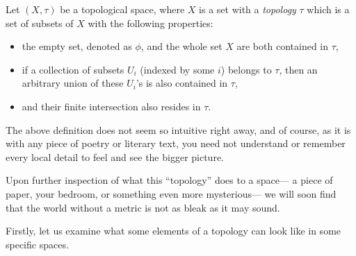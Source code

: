 \documentclass[11pt, letterpaper]{article}
\begin{document}
\begin{mathbox}
Let $(X, \tau)$ be a topological space, where $X$ is a set with a \textit{topology} $\tau$ which is a set of subsets of $X$ with the following properties:
\begin{itemize}
  \item the empty set, denoted as $\phi$, and the whole set $X$ are both contained in $\tau$,
  \item if a collection of subsets $U_i$ (indexed by some $i$) belongs to $\tau$, then an arbitrary union of these $U_i$'s is also contained in $\tau$,
  \item and their finite intersection also resides in $\tau$.
\end{itemize}
\end{mathbox}

The above definition does not seem so intuitive right away, and of course, as it is with any piece of poetry or literary text, you need not understand or remember every local detail to feel and see the bigger picture. 

Upon further inspection of what this ``topology'' does to a space--- a piece of paper, your bedroom, or something even more mysterious--- we will soon find that the world without a metric is not as bleak as it may sound. 

Firstly, let us examine what some elements of a topology can look like in some specific spaces. 
\end{document}
